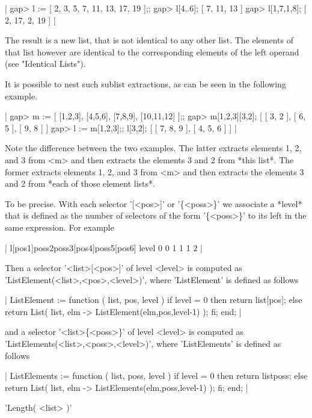 |    gap> l := [ 2, 3, 5, 7, 11, 13, 17, 19 ];;
    gap> l{[4..6]};
    [ 7, 11, 13 ]
    gap> l{[1,7,1,8]};
    [ 2, 17, 2, 19 ] |

The result is a new  list, that is not identical to any other  list.  The
elements of that list however are identical to the corresponding elements
of the left operand (see "Identical Lists").

It  is possible to nest such sublist extractions,  as can be seen  in the
following example.

|    gap> m := [ [1,2,3], [4,5,6], [7,8,9], [10,11,12] ];;
    gap> m{[1,2,3]}{[3,2]};
    [ [ 3, 2 ], [ 6, 5 ], [ 9, 8 ] ]
    gap> l := m{[1,2,3]};; l{[3,2]};
    [ [ 7, 8, 9 ], [ 4, 5, 6 ] ] |

Note  the difference between  the  two  examples.   The  latter  extracts
elements 1, 2, and 3 from <m> and then extracts the elements 3 and 2 from
*this list*.  The former extracts elements 1,  2, and 3 from <m> and then
extracts the elements 3 and 2 from *each of those element lists*.

To be precise.  With each selector '[<pos>]' or '\{<poss>\}' we associate
a  *level*  that  is  defined  as  the number  of selectors  of the  form
'\{<poss>\}' to its left in the same expression.  For example

|        l[pos1]{poss2}{poss3}[pos4]{poss5}[pos6]
    level   0      0      1     1      1     2   |

Then   a  selector  '<list>[<pos>]'  of  level  <level>  is  computed  as
'ListElement(<list>,<pos>,<level>)', where  'ListElement' is  defined  as
follows

|    ListElement := function ( list, pos, level )
        if level = 0  then
            return list[pos];
        else
            return List( list, elm -> ListElement(elm,pos,level-1) );
        fi;
    end; |

and  a selector  '<list>\{<poss>\}'  of  level  <level>  is  computed  as
'ListElements(<list>,<poss>,<level>)', where 'ListElements' is defined as
follows

|    ListElements := function ( list, poss, level )
        if level = 0  then
            return list{poss};
        else
            return List( list, elm -> ListElements(elm,poss,level-1) );
        fi;
    end; |

%

'Length( <list> )'

